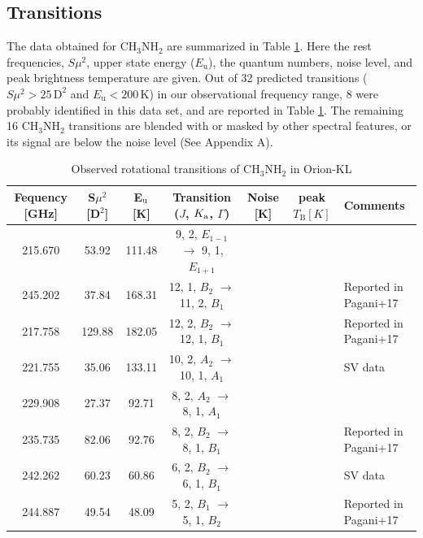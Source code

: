 \subsection{Transitions}
The data obtained for  CH$_{3}$NH$_{2}$ are summarized in Table \ref{tab_MAOri}.
Here the rest frequencies, $S\mu^2$, upper state energy ($E_{\mathrm{u}}$), the quantum numbers,
noise level, and peak brightness temperature are given.
Out of 32 predicted transitions ($S\mu^2 > 25\,\mathrm{D^2}$ and $E_{\mathrm{u}} < 200 \,\mathrm{K}$) 
in our observational frequency range, 8 were probably identified in this data set, and are reported in
Table \ref{tab_MAOri}. The remaining 16 CH$_{3}$NH$_{2}$ transitions are
blended with or masked by other spectral features, or its signal are below the noise level 
(See Appendix A). 

\renewcommand{\arraystretch}{1.5}
\begin{table}[htb]
\begin{center}

  \caption{Observed rotational transitions of CH$_3$NH$_2$ in Orion-KL}
  \label{tab_MAOri}
{\scriptsize
  \begin{tabular}{ccccccl} \hline
   Fequency [GHz]& S$\mu ^{2}$ [D$^2$] & E$_{\rm{u}}$ [K]& Transition ($J$, $K_{\rm{a}}$, $\Gamma$) & Noise [K] & peak $T_{\mathrm{B}} [K]$ &Comments \\ \hline 
    215.670 & 53.92 & 111.48 & 9, 2, $E_{1-1}$ $\rightarrow$ 9, 1, $E_{1+1}$ && &  \\
    245.202 & 37.84 & 168.31 & 12, 1, $B_{2}$ $\rightarrow$ 11, 2, $B_{1}$ & &&Reported in Pagani+17 \\
    217.758 & 129.88 & 182.05 & 12, 2, $B_{2}$ $\rightarrow$ 12, 1, $B_{1}$ &&&Reported in Pagani+17 \\
    221.755 & 35.06 & 133.11 & 10, 2, $A_{2}$ $\rightarrow$ 10, 1, $A_{1}$ &&&SV data \\
    229.908 & 27.37 & 92.71 & 8, 2, $A_{2}$ $\rightarrow$ 8, 1, $A_{1}$ & &&\\ 
    235.735 & 82.06 & 92.76 & 8, 2, $B_{2}$ $\rightarrow$ 8, 1, $B_{1}$ &&&Reported in Pagani+17 \\
    242.262 & 60.23 & 60.86 & 6, 2, $B_{2}$ $\rightarrow$ 6, 1, $B_{1}$ &&&SV data \\
    244.887 & 49.54 & 48.09 & 5, 2, $B_{1}$ $\rightarrow$ 5, 1, $B_{2}$ &&&Reported in Pagani+17 \\ \hline
  \end{tabular}
  }
\end{center}
\end{table}

